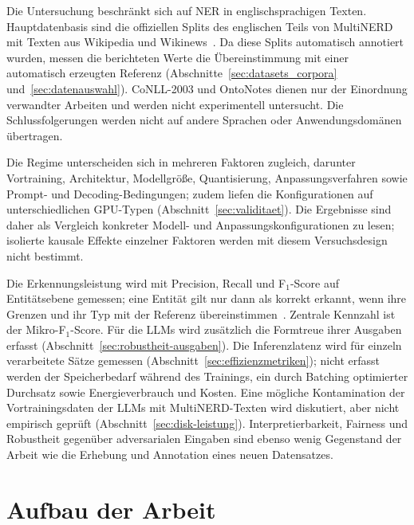 Die Untersuchung beschränkt sich auf NER in englischsprachigen Texten.
Hauptdatenbasis sind die offiziellen Splits des englischen Teils von
MultiNERD mit Texten aus Wikipedia und
Wikinews~\cite{tedeschi2022multinerd,babelscape2023multinerdcard}.
Da diese Splits automatisch annotiert wurden, messen die berichteten Werte
die Übereinstimmung mit einer automatisch erzeugten Referenz
(Abschnitte~\ref{sec:datasets_corpora} und~\ref{sec:datenauswahl}).
CoNLL-2003 und OntoNotes dienen nur der Einordnung verwandter Arbeiten und
werden nicht experimentell untersucht.
Die Schlussfolgerungen werden nicht auf andere Sprachen oder
Anwendungsdomänen übertragen.

Die Regime unterscheiden sich in mehreren Faktoren zugleich, darunter
Vortraining, Architektur, Modellgröße, Quantisierung,
Anpassungsverfahren sowie Prompt- und Decoding-Bedingungen; zudem liefen die Konfigurationen auf
unterschiedlichen GPU-Typen (Abschnitt~\ref{sec:validitaet}).
Die Ergebnisse sind daher als Vergleich konkreter Modell- und
Anpassungskonfigurationen zu lesen; isolierte kausale Effekte einzelner
Faktoren werden mit diesem Versuchsdesign nicht bestimmt.

Die Erkennungsleistung wird mit Precision, Recall und F$_1$-Score auf
Entitätsebene gemessen; eine Entität gilt nur dann als korrekt erkannt,
wenn ihre Grenzen und ihr Typ mit der Referenz
übereinstimmen~\cite{manning2008introduction,sang2003conll}.
Zentrale Kennzahl ist der Mikro-F$_1$-Score.
Für die LLMs wird zusätzlich die Formtreue ihrer Ausgaben erfasst
(Abschnitt~\ref{sec:robustheit-ausgaben}).
Die Inferenzlatenz wird für einzeln verarbeitete Sätze gemessen
(Abschnitt~\ref{sec:effizienzmetriken}); nicht erfasst werden der
Speicherbedarf während des Trainings, ein durch Batching optimierter
Durchsatz sowie Energieverbrauch und Kosten.
Eine mögliche Kontamination der Vortrainingsdaten der LLMs mit
MultiNERD-Texten wird diskutiert, aber nicht empirisch geprüft
(Abschnitt~\ref{sec:disk-leistung}).
Interpretierbarkeit, Fairness und Robustheit gegenüber adversarialen
Eingaben sind ebenso wenig Gegenstand der Arbeit wie die Erhebung und
Annotation eines neuen Datensatzes.

\section{Aufbau der Arbeit}
\label{sec:aufbau_arbeit}

